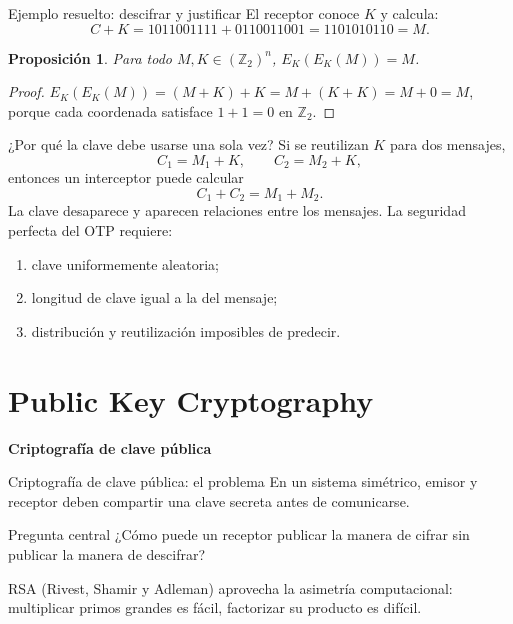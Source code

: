 \documentclass[aspectratio=169,11pt]{beamer}
\newtheorem{proposicion}{Proposición}
\begin{document}
\begin{frame}{Ejemplo resuelto: descifrar y justificar}
  El receptor conoce $K$ y calcula:
  \[
  C+K=1011001111+0110011001=1101010110=M.
  \]
  \begin{proposicion}
    Para todo $M,K{\in(\mathbb Z_2)}^n$, $E_K(E_K(M))=M$.
  \end{proposicion}
  \begin{proof}
    $E_K(E_K(M))=(M+K)+K=M+(K+K)=M+0=M$, porque cada coordenada satisface $1+1=0$ en $\mathbb Z_2$.
  \end{proof}
\end{frame}

\begin{frame}{¿Por qué la clave debe usarse una sola vez?}
  Si se reutilizan $K$ para dos mensajes,
  \[
    C_1=M_1+K,\qquad C_2=M_2+K,
  \]
  entonces un interceptor puede calcular
  \[
    C_1+C_2=M_1+M_2.
  \]
  La clave desaparece y aparecen relaciones entre los mensajes. La seguridad perfecta del OTP requiere:
  \begin{enumerate}
    \item clave uniformemente aleatoria;
    \item longitud de clave igual a la del mensaje;
    \item distribución y reutilización imposibles de predecir.
  \end{enumerate}
\end{frame}

\section{Public Key Cryptography}

\begin{frame}
  \centering
  \vfill
  {\LARGE\bfseries Criptografía de clave pública}
  \vfill
\end{frame}

\begin{frame}{Criptografía de clave pública: el problema}
  En un sistema simétrico, emisor y receptor deben compartir una clave secreta antes de comunicarse.
  \begin{block}{Pregunta central}
    ¿Cómo puede un receptor publicar la manera de cifrar sin publicar la manera de descifrar?
  \end{block}
  RSA (Rivest, Shamir y Adleman) aprovecha la asimetría computacional:
  multiplicar primos grandes es fácil, factorizar su producto es difícil.
\end{frame}
\end{document}
